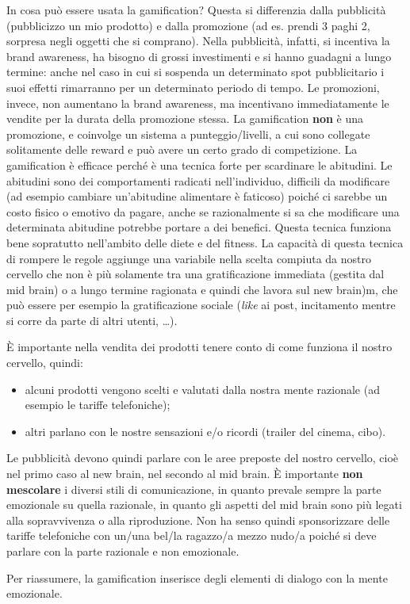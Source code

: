 In cosa può essere usata la gamification? Questa si differenzia dalla
pubblicità (pubblicizzo un mio prodotto) e dalla promozione (ad es. prendi 3
paghi 2, sorpresa negli oggetti che si comprano). Nella pubblicità, infatti, si
incentiva la brand awareness, ha bisogno di grossi investimenti e si hanno
guadagni a lungo termine: anche nel caso in cui si sospenda un determinato spot
pubblicitario i suoi effetti rimarranno per un determinato periodo di tempo. Le
promozioni, invece, non aumentano la brand awareness, ma incentivano
immediatamente le vendite per la durata della promozione stessa. La
gamification \textbf{non} è una promozione, e coinvolge un sistema a
punteggio/livelli, a cui sono collegate solitamente delle reward e può avere un
certo grado di competizione.
La gamification è efficace perché è una tecnica forte per scardinare le
abitudini. Le abitudini sono dei comportamenti radicati nell'individuo,
difficili da modificare (ad esempio cambiare un'abitudine alimentare è
faticoso) poiché ci sarebbe un costo fisico o emotivo da pagare, anche se
razionalmente si sa che modificare una determinata abitudine potrebbe portare a
dei benefici. Questa tecnica funziona bene sopratutto nell'ambito delle diete e
del fitness. La capacità di questa tecnica di rompere le regole aggiunge una
variabile nella scelta compiuta da nostro cervello che non è più solamente tra
una gratificazione immediata (gestita dal mid brain) o a lungo termine 
ragionata e quindi che lavora sul new brain)m, che può essere per esempio la
gratificazione sociale (\emph{like} ai post, incitamento mentre si corre da
parte di altri utenti, \dots{}).

È importante nella vendita dei prodotti tenere conto di come funziona il nostro
cervello, quindi:
\begin{itemize}
 \item alcuni prodotti vengono scelti e valutati dalla nostra mente razionale
 (ad esempio le tariffe telefoniche);
 \item altri parlano con le nostre sensazioni e/o ricordi (trailer del cinema,
 cibo).
\end{itemize}

Le pubblicità devono quindi parlare con le aree preposte del nostro cervello,
cioè nel primo caso al new brain, nel secondo al mid brain. È importante
\textbf{non mescolare} i diversi stili di comunicazione, in quanto prevale
sempre la parte emozionale su quella razionale, in quanto gli aspetti del mid
brain sono più legati alla sopravvivenza o alla riproduzione. Non ha senso
quindi sponsorizzare delle tariffe telefoniche con un/una bel/la ragazzo/a
mezzo nudo/a poiché si deve parlare con la parte razionale e non emozionale.

Per riassumere, la gamification inserisce degli elementi di dialogo
con la mente emozionale.
